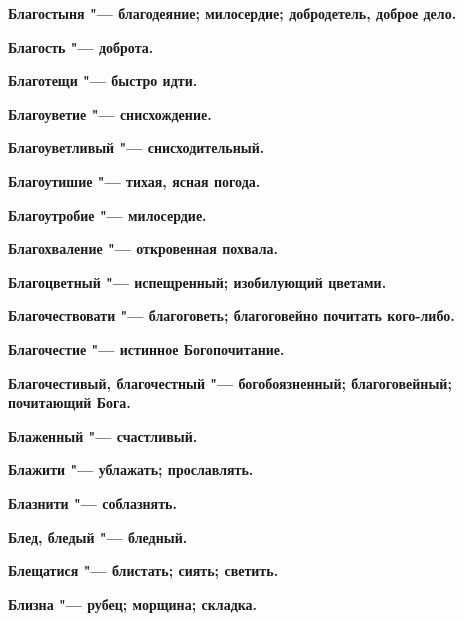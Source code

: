 \begin{mymulticols}{2}
\bfseries Благостыня\normalfont{} "--- благодеяние; милосердие; добродетель, доброе дело. 




\bfseries Благость\normalfont{} "--- доброта. 




\bfseries Благотещи\normalfont{} "--- быстро идти. 




\bfseries Благоуветие\normalfont{} "--- снисхождение. 




\bfseries Благоуветливый\normalfont{} "--- снисходительный. 




\bfseries Благоутишие\normalfont{} "--- тихая, ясная погода. 




\bfseries Благоутробие\normalfont{} "--- милосердие. 




\bfseries Благохваление\normalfont{} "--- откровенная похвала. 




\bfseries Благоцветный\normalfont{} "--- испещренный; изобилующий цветами. 




\bfseries Благочествовати\normalfont{} "--- благоговеть; благоговейно почитать кого-либо. 




\bfseries Благочестие\normalfont{} "--- истинное Богопочитание. 




\bfseries Благочестивый, благочестный\normalfont{} "--- богобоязненный; благоговейный; почитающий Бога. 




\bfseries Блаженный\normalfont{} "--- счастливый. 




\bfseries Блажити\normalfont{} "--- ублажать; прославлять. 




\bfseries Блазнити\normalfont{} "--- соблазнять. 




\bfseries Блед, бледый\normalfont{} "--- бледный. 




\bfseries Блещатися\normalfont{} "--- блистать; сиять; светить. 




\bfseries Близна\normalfont{} "--- рубец; морщина; складка. 





\end{mymulticols}
